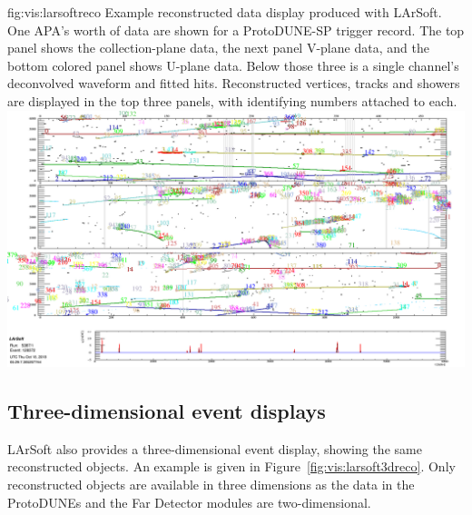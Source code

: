 \documentclass[../main-v1.tex]{subfiles}
\begin{document}
\begin{dunefigure}
{fig:vis:larsoftreco} 
{Example reconstructed data display produced with LArSoft.  One APA's worth of data are shown for a ProtoDUNE-SP trigger record. The top panel shows the collection-plane data, the next panel V-plane data, and the bottom colored panel shows U-plane data.  Below those three is a single channel's deconvolved waveform and fitted hits.  Reconstructed vertices, tracks and showers are displayed in the top three panels, with identifying numbers attached to each.}
\includegraphics[width=0.9 \textwidth]{graphics/EventDisplays/larsoft_reco_example_evd.png}
\end{dunefigure}


\subsection{Three-dimensional event displays}
\label{sec:visualization:3d}

 LArSoft also provides a three-dimensional event display, showing the same reconstructed objects.  An example is given in Figure~\ref{fig:vis:larsoft3dreco}.  Only reconstructed objects are available in three dimensions as the data in the ProtoDUNEs and the Far Detector modules are two-dimensional.
 
\end{document}
